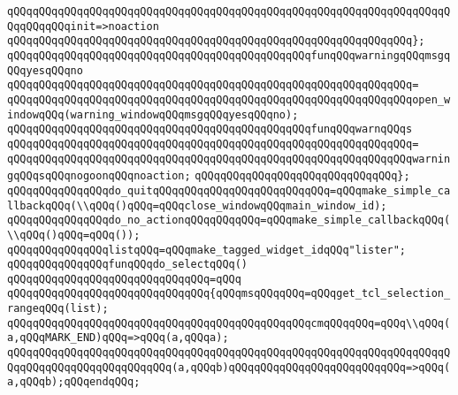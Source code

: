 \verb|qQQqqQQqqQQqqQQqqQQqqQQqqQQqqQQqqQQqqQQqqQQqqQQqqQQqqQQqqQQqqQQqqQQqqQQqqQQqqQQqinit=>noaction|\newline
\verb|qQQqqQQqqQQqqQQqqQQqqQQqqQQqqQQqqQQqqQQqqQQqqQQqqQQqqQQqqQQqqQQq};|\newline
\newline
\verb|qQQqqQQqqQQqqQQqqQQqqQQqqQQqqQQqqQQqqQQqqQQqqQQqfunqQQqwarningqQQqmsgqQQqyesqQQqno|\newline
\verb|qQQqqQQqqQQqqQQqqQQqqQQqqQQqqQQqqQQqqQQqqQQqqQQqqQQqqQQqqQQqqQQq=|\newline
\verb|qQQqqQQqqQQqqQQqqQQqqQQqqQQqqQQqqQQqqQQqqQQqqQQqqQQqqQQqqQQqqQQqopen_windowqQQq(warning_windowqQQqmsgqQQqyesqQQqno);|\newline
\newline
\verb|qQQqqQQqqQQqqQQqqQQqqQQqqQQqqQQqqQQqqQQqqQQqqQQqfunqQQqwarnqQQqs|\newline
\verb|qQQqqQQqqQQqqQQqqQQqqQQqqQQqqQQqqQQqqQQqqQQqqQQqqQQqqQQqqQQqqQQq=|\newline
\verb|qQQqqQQqqQQqqQQqqQQqqQQqqQQqqQQqqQQqqQQqqQQqqQQqqQQqqQQqqQQqqQQqwarningqQQqsqQQqnogoonqQQqnoaction;|\newline
\verb|qQQqqQQqqQQqqQQqqQQqqQQqqQQqqQQq};|\newline
\newline
\newline
\verb|qQQqqQQqqQQqqQQqdo_quitqQQqqQQqqQQqqQQqqQQqqQQqqQQq=qQQqmake_simple_callbackqQQq(\\qQQq()qQQq=qQQqclose_windowqQQqmain_window_id);|\newline
\verb|qQQqqQQqqQQqqQQqdo_no_actionqQQqqQQqqQQq=qQQqmake_simple_callbackqQQq(\\qQQq()qQQq=qQQq());|\newline
\newline
\verb|qQQqqQQqqQQqqQQqlistqQQq=qQQqmake_tagged_widget_idqQQq"lister";|\newline
\newline
\verb|qQQqqQQqqQQqqQQqfunqQQqdo_selectqQQq()|\newline
\verb|qQQqqQQqqQQqqQQqqQQqqQQqqQQqqQQq=qQQq|\newline
\verb|qQQqqQQqqQQqqQQqqQQqqQQqqQQqqQQq{qQQqmsqQQqqQQq=qQQqget_tcl_selection_rangeqQQq(list);|\newline
\newline
\verb|qQQqqQQqqQQqqQQqqQQqqQQqqQQqqQQqqQQqqQQqqQQqqQQqcmqQQqqQQq=qQQq\\qQQq(a,qQQqMARK_END)qQQq=>qQQq(a,qQQqa);|\newline
\verb|qQQqqQQqqQQqqQQqqQQqqQQqqQQqqQQqqQQqqQQqqQQqqQQqqQQqqQQqqQQqqQQqqQQqqQQqqQQqqQQqqQQqqQQqqQQqqQQq(a,qQQqb)qQQqqQQqqQQqqQQqqQQqqQQqqQQq=>qQQq(a,qQQqb);qQQqendqQQq;|\newline
